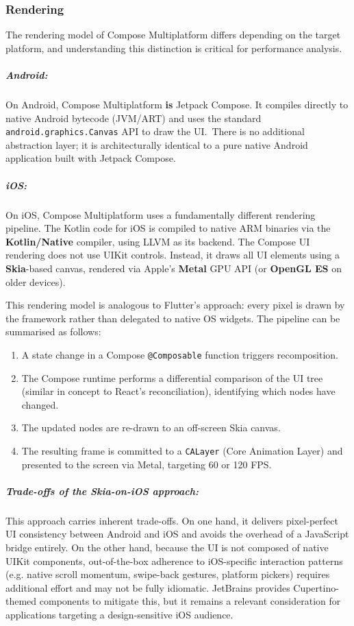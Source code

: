     \subsubsection{Rendering}

    The rendering model of Compose Multiplatform differs depending on the target platform, and understanding this distinction is critical for performance analysis.

    \subparagraph{Android:}
    On Android, Compose Multiplatform \textbf{is} Jetpack Compose. It compiles directly to native Android bytecode (JVM/ART) and uses the standard \\
    \texttt{android.graphics.Canvas} API to draw the UI.\ There is no additional abstraction layer; it is architecturally identical to a pure native Android application built with Jetpack Compose.

    \subparagraph{iOS:}
    On iOS, Compose Multiplatform uses a fundamentally different rendering pipeline. The Kotlin code for iOS is compiled to native ARM binaries via the \textbf{Kotlin/Native} compiler, using LLVM as its backend. The Compose UI rendering does not use UIKit controls. Instead, it draws all UI elements using a \textbf{Skia}-based canvas, rendered via Apple's \textbf{Metal} GPU API (or \textbf{OpenGL ES} on older devices). \cite{KMP:01}

    This rendering model is analogous to Flutter's approach: every pixel is drawn by the framework rather than delegated to native OS widgets. The pipeline can be summarised as follows:

    \begin{enumerate}
        \item A state change in a Compose \texttt{@Composable} function triggers recomposition.
        \item The Compose runtime performs a differential comparison of the UI tree (similar in concept to React's reconciliation), identifying which nodes have changed.
        \item The updated nodes are re-drawn to an off-screen Skia canvas.
        \item The resulting frame is committed to a \texttt{CALayer} (Core Animation Layer) and presented to the screen via Metal, targeting 60 or 120 FPS.
    \end{enumerate}

    \subparagraph{Trade-offs of the Skia-on-iOS approach:}
    This approach carries inherent trade-offs. On one hand, it delivers pixel-perfect UI consistency between Android and iOS and avoids the overhead of a JavaScript bridge entirely. On the other hand, because the UI is not composed of native UIKit components, out-of-the-box adherence to iOS-specific interaction patterns (e.g. native scroll momentum, swipe-back gestures, platform pickers) requires additional effort and may not be fully idiomatic. JetBrains provides Cupertino-themed components to mitigate this, but it remains a relevant consideration for applications targeting a design-sensitive iOS audience. \cite{KMP:01}

